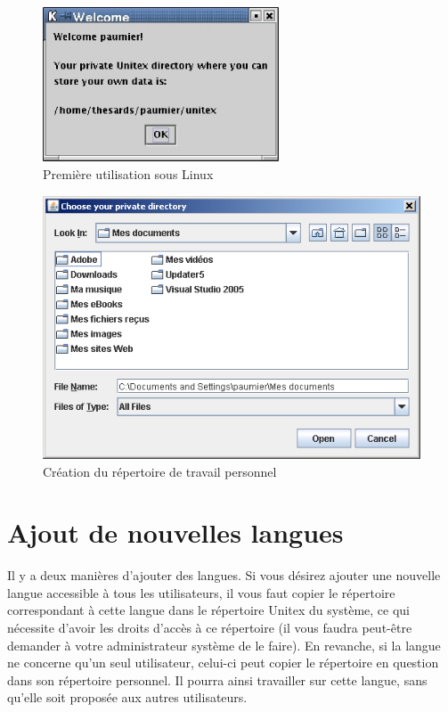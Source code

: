 \begin{figure}[h]
\begin{center}
\includegraphics[width=7cm]{resources/img/fig1-2.png}
\caption{Première utilisation sous Linux}
\end{center}
\end{figure}

\begin{figure}[h]
\begin{center}
\includegraphics[width=13cm]{resources/img/fig1-3.png}
\caption{Création du répertoire de travail personnel
\label{fig-creation-personal-directory}}
\end{center}
\end{figure}



\section{Ajout de nouvelles langues}

\bigskip
\noindent Il y a deux manières d’ajouter des langues. Si vous désirez ajouter une nouvelle langue
accessible à tous les utilisateurs, il vous faut copier le répertoire correspondant à cette langue
dans le répertoire Unitex du système, ce qui nécessite d’avoir les droits d’accès à ce répertoire
(il vous faudra peut-être demander à votre administrateur système de le faire).
En revanche, si la langue ne concerne qu’un seul utilisateur, celui-ci peut copier le répertoire
en question dans son répertoire personnel. Il pourra ainsi travailler sur cette langue, sans
qu’elle soit proposée aux autres utilisateurs.



